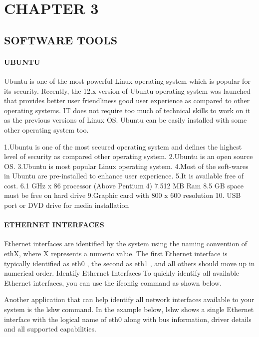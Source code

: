 

\chapter{CHAPTER 3}





\section{SOFTWARE TOOLS}

\subsubsection{UBUNTU}
Ubuntu is one of the most powerful Linux operating system which is popular for its security. Recently, the 12.x version of Ubuntu operating system was launched that provides better user friendliness good user experience as compared to other operating systems. IT does not require too much of technical skills to work on it as the previous versions of Linux OS. Ubuntu can be easily installed with some other operating system too. 

1.Ubuntu is one of the most secured operating system and defines the highest level of security as compared other operating system.
2.Ubuntu is an open source OS.
3.Ubuntu is most popular Linux operating system.
4.Most of the soft-wares in Ubuntu are pre-installed to enhance user experience.
5.It is available free of cost.
6.1 GHz x 86 processor (Above Pentium 4)
7.512 MB Ram
8.5 GB space must be free on hard drive
9.Graphic card with 800 x 600 resolution
10. USB port or DVD drive for media installation

\subsubsection{ETHERNET INTERFACES}
Ethernet interfaces are identified by the system using the naming convention of ethX, where X represents a numeric value. The first Ethernet interface is typically identified as eth0 , the second as eth1 , and all others should move up in numerical order. Identify Ethernet Interfaces To quickly identify all available Ethernet interfaces, you can use the ifconfig command as shown below.

Another application that can help identify all network interfaces available to your system is the lshw command. In the example below, lshw shows a single Ethernet interface with the logical name of eth0 along with bus information, driver details and all supported capabilities.
